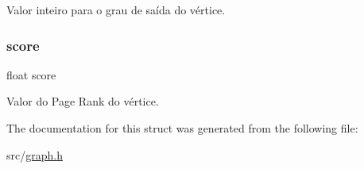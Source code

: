 Valor inteiro para o grau de saída do vértice. \mbox{\label{struct_vertex_a8c5cd9b525ee73a24b1d9d8e34982d1c}} 
\subsubsection{\texorpdfstring{score}{score}}
{\footnotesize\ttfamily float score}

Valor do Page Rank do vértice. 

The documentation for this struct was generated from the following file\+:\begin{DoxyCompactItemize}
\item 
src/\mbox{\hyperlink{graph_8h}{graph.\+h}}\end{DoxyCompactItemize}
